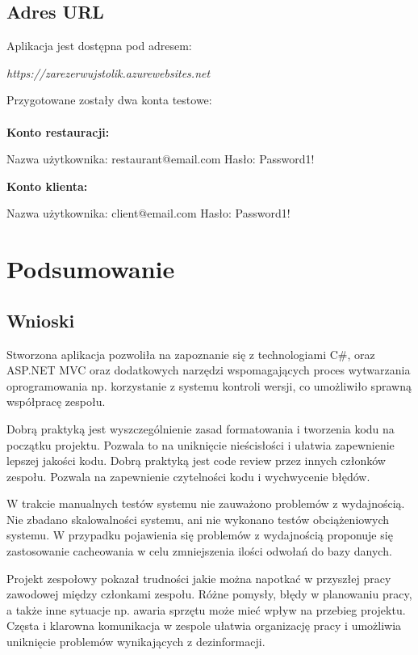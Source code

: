 \documentclass{article}
\newcommand\tab[1][1cm]{\hspace*{#1}}
\begin{document}
\subsection{Adres URL}
Aplikacja jest dostępna pod adresem:
\begin{center}
\textit{https://zarezerwujstolik.azurewebsites.net}
\end{center}
Przygotowane zostały dwa konta testowe:\\\\
\textbf{Konto restauracji:}
\begin{center}
Nazwa użytkownika: restaurant@email.com Hasło: Password1!
\end{center}
\textbf{Konto klienta:}
\begin{center}
Nazwa użytkownika: client@email.com Hasło: Password1!
\end{center}

\newpage

\section{Podsumowanie}

\subsection{Wnioski}
\tab Stworzona aplikacja pozwoliła na zapoznanie się z technologiami C\#, oraz \\ ASP.NET MVC oraz dodatkowych narzędzi wspomagających proces wytwarzania oprogramowania np. korzystanie z systemu kontroli wersji, co umożliwiło sprawną współpracę zespołu.  

Dobrą praktyką jest wyszczególnienie zasad formatowania i tworzenia kodu na początku projektu. Pozwala to na uniknięcie nieścisłości i ułatwia zapewnienie lepszej jakości kodu. Dobrą praktyką jest code review przez innych członków zespołu. Pozwala na zapewnienie czytelności kodu i wychwycenie błędów. 

W trakcie manualnych testów systemu nie zauważono problemów z wydajnością. Nie zbadano skalowalności systemu, ani nie wykonano testów obciążeniowych systemu. W przypadku pojawienia się problemów z wydajnością proponuje się zastosowanie cacheowania w celu zmniejszenia ilości odwołań do bazy danych.

Projekt zespołowy pokazał trudności jakie można napotkać w przyszłej pracy zawodowej między członkami zespołu. Różne pomysły, błędy w planowaniu pracy, a także inne sytuacje np. awaria sprzętu może mieć wpływ na przebieg projektu. Częsta i klarowna komunikacja w zespole ułatwia organizację pracy i umożliwia uniknięcie problemów wynikających z dezinformacji.
\end{document}
